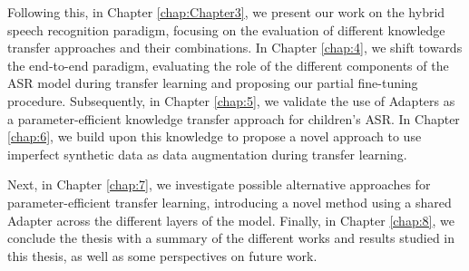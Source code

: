 Following this, in Chapter \ref{chap:Chapter3}, we present our work on the hybrid speech recognition paradigm, focusing on the evaluation of different knowledge transfer approaches and their combinations. In Chapter \ref{chap:4}, we shift towards the end-to-end paradigm, evaluating the role of the different components of the \ac{ASR} model during transfer learning and proposing our partial fine-tuning procedure. Subsequently, in Chapter \ref{chap:5}, we validate the use of Adapters as a parameter-efficient knowledge transfer approach for children's \ac{ASR}. In Chapter \ref{chap:6}, we build upon this knowledge to propose a novel approach to use imperfect synthetic data as data augmentation during transfer learning.

Next, in Chapter \ref{chap:7}, we investigate possible alternative approaches for parameter-efficient transfer learning, introducing a novel method using a shared Adapter across the different layers of the model. Finally, in Chapter \ref{chap:8}, we conclude the thesis with a summary of the different works and results studied in this thesis, as well as some perspectives on future work. 